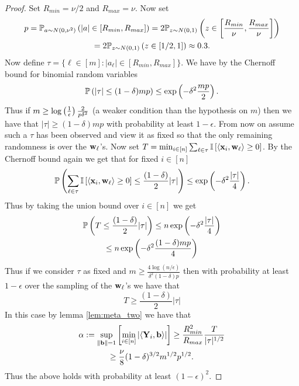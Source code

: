 \begin{proof}
Set $R_{min} = \nu/2$ and $R_{max} = \nu$.  Now set 
\begin{gather*}
p = \mathbb{P}_{a \sim N(0, \nu^2)}\left(|a| \in [R_{min}, R_{max}]\right)
= 2 \mathbb{P}_{z \sim N(0,1)}\left(z \in \left[\frac{R_{min}}{\nu}, \frac{R_{max}}{\nu}\right]\right) \\
= 2 \mathbb{P}_{z \sim N(0,1)}\left(z \in \left[1/2, 1\right]\right) \approx 0.3 . 
\end{gather*}
Now define $\tau = \{ \ell \in [m] : |a_\ell| \in [R_{min}, R_{max}] \}$.  We have by the Chernoff bound for binomial random variables
\[ 
\mathbb{P}\left(|\tau| \leq (1 - \delta)mp\right) \leq \exp\left(-\delta^2 \frac{mp}{2}\right). 
\]
Thus if $m \geq \log\left(\frac{1}{\epsilon}\right) \frac{2}{p \delta^2}$ (a weaker condition than the hypothesis on $m$) then we have that $|\tau| \geq (1 - \delta) mp$ with probability at least $1 - \epsilon$.  From now on assume such a $\tau$ has been observed and view it as fixed so that the only remaining randomness is over the $\mathbf{w}_\ell$'s.  Now set $T = \min_{i \in [n]} \sum_{\ell \in \tau} \mathbb{I}\left[\langle \mathbf{x}_i, \mathbf{w}_\ell \rangle \geq 0\right]$.  By the Chernoff bound again we get that for fixed $i \in [n]$
\[ \mathbb{P}\left(\sum_{\ell \in \tau} \mathbb{I}\left[\langle \mathbf{x}_i, \mathbf{w}_\ell \rangle \geq 0\right] \leq \frac{(1 - \delta)}{2} |\tau|\right) \leq \exp\left(-\delta^2 \frac{|\tau|}{4}\right). \]
Thus by taking the union bound over $i \in [n]$ we get
\begin{gather*}
\mathbb{P}\left(T \leq \frac{(1 - \delta)}{2} |\tau|\right) \leq n \exp\left(-\delta^2 \frac{|\tau|}{4}\right) \\
\leq n \exp \left(-\delta^2 \frac{(1 - \delta) mp}{4}\right)    
\end{gather*}
Thus if we consider $\tau$ as fixed and $m \geq \frac{4 \log(n / \epsilon)}{\delta^2 (1 - \delta) p}$ then with probability at least $1 - \epsilon$ over the sampling of the $\mathbf{w}_\ell$'s we have that 
\[ T \geq \frac{(1 - \delta)}{2} |\tau| \]
In this case by lemma \ref{lem:meta_two} we have that
\begin{gather*}
\alpha := \sup_{\left\lVert\mathbf b\right\rVert = 1} \left[\min_{i \in [n]} |\langle \mathbf{Y}_i, \mathbf b \rangle| \right] \geq \frac{R_{min}^2}{R_{max}} \frac{T}{|\tau|^{1/2}}\\
\geq \frac{\nu}{8} (1 - \delta)^{3/2} m^{1/2} p^{1/2}.
\end{gather*}
Thus the above holds with probability at least $(1 - \epsilon)^2$.
\end{proof}


